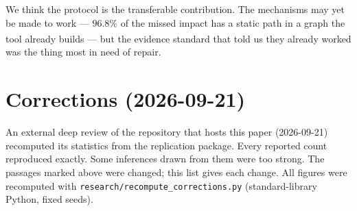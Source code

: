 \documentclass[sigconf,review,anonymous]{acmart}
\newcommand{\corr}{\textsuperscript{\dag}}
\begin{document}
We think the protocol is the transferable contribution. The mechanisms may yet be made to work ---
$96.8\%$ of the missed impact has a static path in a graph the tool already builds\corr{} --- but the evidence
standard that told us they already worked was the thing most in need of repair.

\section*{Corrections (2026-09-21)}

An external deep review of the repository that hosts this paper (2026-09-21) recomputed its
statistics from the replication package. Every reported count reproduced exactly. Some inferences
drawn from them were too strong. The passages marked \dag{} above were changed; this list gives
each change. All figures were recomputed with \texttt{research/recompute\_corrections.py}
(standard-library Python, fixed seeds).
\end{document}
